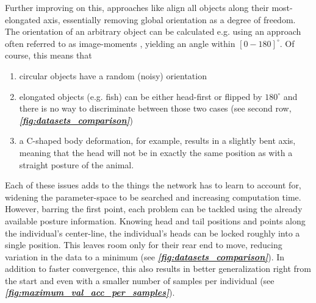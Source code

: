 \documentclass[9pt,lineno]{elife}
\newcommand{\figref}[1]{\textit{\textbf{\ref{#1}}}}
\newcommand{\idtracker}{\protect\path{ idtracker.ai}}
\begin{document}
Further improving on this, approaches like \idtracker{} align all objects along their most-elongated axis, essentially removing global orientation as a degree of freedom. The orientation of an arbitrary object can be calculated e.g. using an approach often referred to as image-moments \citep{hu1962visual}, yielding an angle within $[0-180]^\circ$. Of course, this means that

\begin{enumerate}
\item circular objects have a random (noisy) orientation
\item elongated objects (e.g. fish) can be either head-first or flipped by $180^\circ$ and there is no way to discriminate between those two cases (see second row, \figref{fig:datasets_comparison})
\item a C-shaped body deformation, for example, results in a slightly bent axis, meaning that the head will not be in exactly the same position as with a straight posture of the animal.
\end{enumerate}


Each of these issues adds to the things the network has to learn to account for, widening the parameter-space to be searched and increasing computation time. However, barring the first point, each problem can be tackled using the already available posture information. Knowing head and tail positions and points along the individual's center-line, the individual's heads can be locked roughly into a single position. This leaves room only for their rear end to move, reducing variation in the data to a minimum (see \figref{fig:datasets_comparison}). In addition to faster convergence, this also results in better generalization right from the start and even with a smaller number of samples per individual (see \figref{fig:maximum_val_acc_per_samples}).
\end{document}
